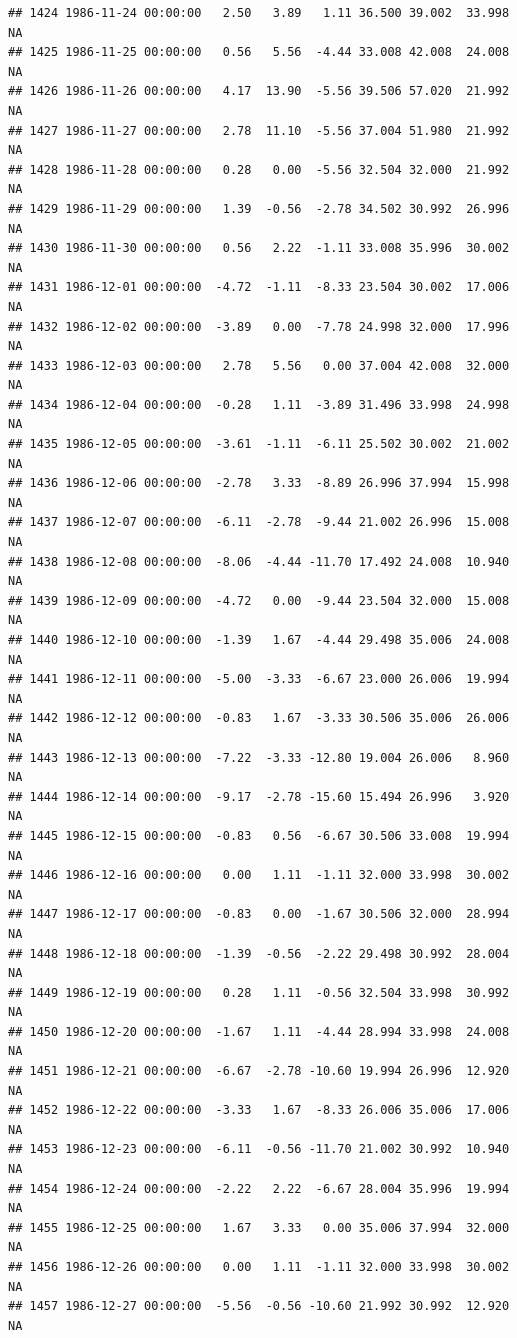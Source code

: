 \documentclass{article}\usepackage{graphicx, color}
\makeatletter
\newenvironment{kframe}{%
 \def\at@end@of@kframe{}%
 \ifinner\ifhmode%
  \def\at@end@of@kframe{\end{minipage}}%
  \begin{minipage}{\columnwidth}%
 \fi\fi%
 \def\FrameCommand##1{\hskip\@totalleftmargin \hskip-\fboxsep
 \colorbox{shadecolor}{##1}\hskip-\fboxsep
     \hskip-\linewidth \hskip-\@totalleftmargin \hskip\columnwidth}%
 \MakeFramed {\advance\hsize-\width
   \@totalleftmargin\z@ \linewidth\hsize
   \@setminipage}}%
 {\par\unskip\endMakeFramed%
 \at@end@of@kframe}
\newenvironment{knitrout}{}{} %
\makeatother
\begin{document}
\begin{knitrout}
\begin{kframe}
\begin{verbatim}
## 1424 1986-11-24 00:00:00   2.50   3.89   1.11 36.500 39.002  33.998     NA
## 1425 1986-11-25 00:00:00   0.56   5.56  -4.44 33.008 42.008  24.008     NA
## 1426 1986-11-26 00:00:00   4.17  13.90  -5.56 39.506 57.020  21.992     NA
## 1427 1986-11-27 00:00:00   2.78  11.10  -5.56 37.004 51.980  21.992     NA
## 1428 1986-11-28 00:00:00   0.28   0.00  -5.56 32.504 32.000  21.992     NA
## 1429 1986-11-29 00:00:00   1.39  -0.56  -2.78 34.502 30.992  26.996     NA
## 1430 1986-11-30 00:00:00   0.56   2.22  -1.11 33.008 35.996  30.002     NA
## 1431 1986-12-01 00:00:00  -4.72  -1.11  -8.33 23.504 30.002  17.006     NA
## 1432 1986-12-02 00:00:00  -3.89   0.00  -7.78 24.998 32.000  17.996     NA
## 1433 1986-12-03 00:00:00   2.78   5.56   0.00 37.004 42.008  32.000     NA
## 1434 1986-12-04 00:00:00  -0.28   1.11  -3.89 31.496 33.998  24.998     NA
## 1435 1986-12-05 00:00:00  -3.61  -1.11  -6.11 25.502 30.002  21.002     NA
## 1436 1986-12-06 00:00:00  -2.78   3.33  -8.89 26.996 37.994  15.998     NA
## 1437 1986-12-07 00:00:00  -6.11  -2.78  -9.44 21.002 26.996  15.008     NA
## 1438 1986-12-08 00:00:00  -8.06  -4.44 -11.70 17.492 24.008  10.940     NA
## 1439 1986-12-09 00:00:00  -4.72   0.00  -9.44 23.504 32.000  15.008     NA
## 1440 1986-12-10 00:00:00  -1.39   1.67  -4.44 29.498 35.006  24.008     NA
## 1441 1986-12-11 00:00:00  -5.00  -3.33  -6.67 23.000 26.006  19.994     NA
## 1442 1986-12-12 00:00:00  -0.83   1.67  -3.33 30.506 35.006  26.006     NA
## 1443 1986-12-13 00:00:00  -7.22  -3.33 -12.80 19.004 26.006   8.960     NA
## 1444 1986-12-14 00:00:00  -9.17  -2.78 -15.60 15.494 26.996   3.920     NA
## 1445 1986-12-15 00:00:00  -0.83   0.56  -6.67 30.506 33.008  19.994     NA
## 1446 1986-12-16 00:00:00   0.00   1.11  -1.11 32.000 33.998  30.002     NA
## 1447 1986-12-17 00:00:00  -0.83   0.00  -1.67 30.506 32.000  28.994     NA
## 1448 1986-12-18 00:00:00  -1.39  -0.56  -2.22 29.498 30.992  28.004     NA
## 1449 1986-12-19 00:00:00   0.28   1.11  -0.56 32.504 33.998  30.992     NA
## 1450 1986-12-20 00:00:00  -1.67   1.11  -4.44 28.994 33.998  24.008     NA
## 1451 1986-12-21 00:00:00  -6.67  -2.78 -10.60 19.994 26.996  12.920     NA
## 1452 1986-12-22 00:00:00  -3.33   1.67  -8.33 26.006 35.006  17.006     NA
## 1453 1986-12-23 00:00:00  -6.11  -0.56 -11.70 21.002 30.992  10.940     NA
## 1454 1986-12-24 00:00:00  -2.22   2.22  -6.67 28.004 35.996  19.994     NA
## 1455 1986-12-25 00:00:00   1.67   3.33   0.00 35.006 37.994  32.000     NA
## 1456 1986-12-26 00:00:00   0.00   1.11  -1.11 32.000 33.998  30.002     NA
## 1457 1986-12-27 00:00:00  -5.56  -0.56 -10.60 21.992 30.992  12.920     NA

\end{verbatim}
\end{kframe}
\end{knitrout}
\end{document}
